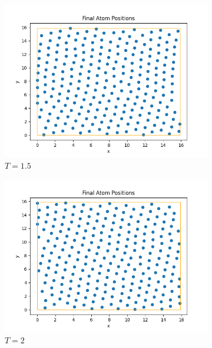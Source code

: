 \documentclass{article}
\begin{document}
\begin{figure}[H]
    \begin{subfigure}{0.495\textwidth}
        \centering
        \includegraphics[width=\textwidth]{images/Final1.5.png}
        \caption{$T=1.5$}
    \end{subfigure}
    \hfill
    \begin{subfigure}{0.495\textwidth}
        \centering
        \includegraphics[width=\textwidth]{images/Final2.png}
        \caption{$T=2$}
    \end{subfigure}
    \medskip
    \begin{subfigure}{0.495\textwidth}
        \centering

\end{subfigure}
\end{figure}
\end{document}
